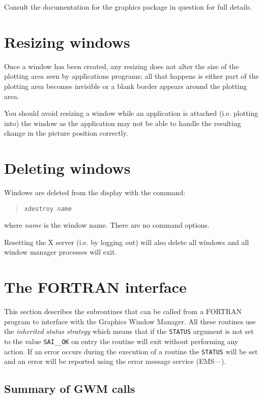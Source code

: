 \documentclass[twoside,11pt,nolof]{starlink}
\begin{document}
Consult the documentation for the graphics package in question for full
details.

\section{Resizing windows}
Once a window has been created, any resizing does not alter the size of the
plotting area seen by applications programs; all that happens is either part of
the plotting area becomes invisible or a blank border appears around the
plotting area.

You should avoid resizing a window while an application is attached (i.e.
plotting into) the window as the application may not be able to handle the
resulting change in the picture position correctly.

\section{Deleting windows}
Windows are deleted from the display with the command:
\begin{quote}\texttt{xdestroy \emph{name}}
\end{quote}
where \emph{name} is the window name. There are no command options.

Resetting the X server (i.e. by logging out) will also delete all windows
and all window manager processes will exit.

\section{The FORTRAN interface}

This section describes the subroutines that can be called from a FORTRAN
program to interface with the Graphics Window Manager. All these routines
use the \emph{inherited status strategy} which means that if the \texttt{STATUS}
argument is not set to the value \texttt{SAI\_\_OK} on entry the routine will
exit without performing any action. If an error occurs during the execution
of a routine the \texttt{STATUS} will be set and an error will be reported
using the error message service
(EMS---).

\subsection{Summary of GWM calls}
\end{document}
